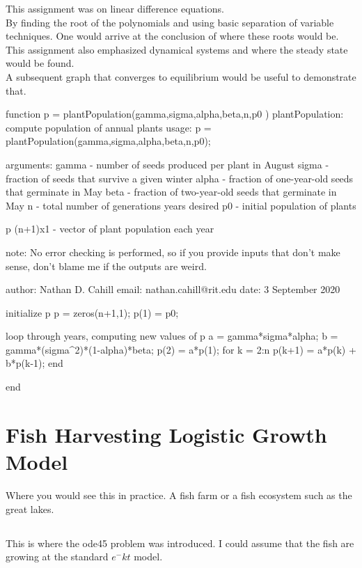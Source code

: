 This assignment was on linear difference equations. \\ 

By finding the root of the polynomials and using basic separation of variable techniques. One would arrive at the conclusion of where these roots would be. \\ 

This assignment also emphasized dynamical systems and where the steady state would be found. \\

A subsequent graph that converges to equilibrium would be useful to demonstrate that. 

\begin{1stlisting}
function p = plantPopulation(gamma,sigma,alpha,beta,n,p0 )
plantPopulation: compute population of annual plants
 usage: p = plantPopulation(gamma,sigma,alpha,beta,n,p0);

 arguments:
   gamma - number of seeds produced per plant in August
   sigma - fraction of seeds that survive a given winter
   alpha - fraction of one-year-old seeds that germinate in May
   beta - fraction of two-year-old seeds that germinate in May
   n - total number of generations years desired
  p0 - initial population of plants

   p (n+1)x1 - vector of plant population each year

 note: No error checking is performed, so if you provide inputs that don't
 make sense, don't blame me if the outputs are weird.

 author: Nathan D. Cahill
 email: nathan.cahill@rit.edu
 date: 3 September 2020

 initialize p
p = zeros(n+1,1);
p(1) = p0;

 loop through years, computing new values of p
a = gamma*sigma*alpha;
b = gamma*(sigma^2)*(1-alpha)*beta;
p(2) = a*p(1);
for k = 2:n
    p(k+1) = a*p(k) + b*p(k-1);
end

end

\end{1stlisting}




\section{Fish Harvesting Logistic Growth Model}
Where you would see this in practice. A fish farm or a fish ecosystem such as the great lakes. \\  
\subsection{}
This is where the ode45 problem was introduced. 
I could assume that the fish are growing at the standard $e^-kt$ model.  

